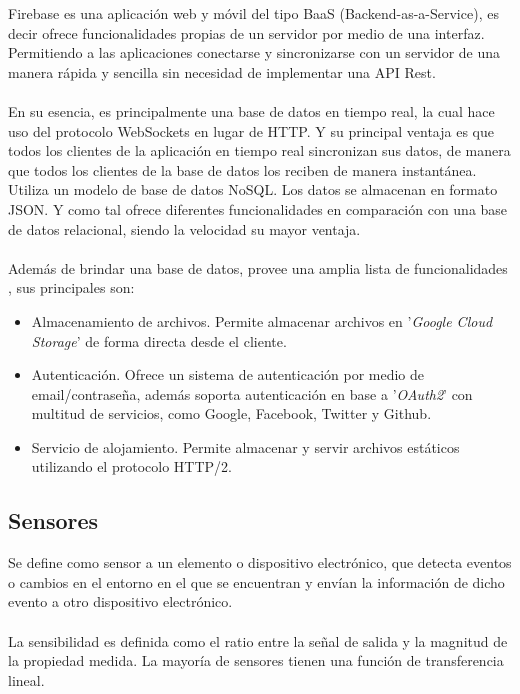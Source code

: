 Firebase \cite{firebase} es una aplicación web y móvil del tipo BaaS (Backend-as-a-Service), es decir ofrece funcionalidades propias de un servidor por medio de una interfaz. Permitiendo a las aplicaciones conectarse y sincronizarse con un servidor de una manera rápida y sencilla sin necesidad de implementar una API Rest.
\\
\\
En su esencia, es principalmente una base de datos en tiempo real, la cual hace uso del protocolo WebSockets en lugar de HTTP. Y su principal ventaja es que todos los clientes de la aplicación en tiempo real sincronizan sus datos, de manera que todos los clientes de la base de datos los reciben de manera instantánea.
\\
Utiliza un modelo de base de datos NoSQL. Los datos se almacenan en formato JSON. Y como tal ofrece diferentes funcionalidades en comparación con una base de datos relacional, siendo la velocidad su mayor ventaja.
\\
\\
Además de brindar una base de datos, provee una amplia lista de funcionalidades , sus principales son:
\begin{itemize}
\item Almacenamiento de archivos. Permite almacenar archivos en '\textit{Google Cloud Storage}' de forma directa desde el cliente.
\item Autenticación. Ofrece un sistema de autenticación por medio de email/contraseña, además soporta autenticación en base a '\textit{OAuth2}' con multitud de servicios, como Google, Facebook, Twitter y Github.
\item Servicio de alojamiento. Permite almacenar y servir archivos estáticos utilizando el protocolo HTTP/2.
\end{itemize}


\subsection{Sensores}

Se define como sensor a un elemento o dispositivo electrónico, que detecta eventos o cambios en el entorno en el que se encuentran y envían la información de dicho evento a otro dispositivo electrónico.
\\
\\
La sensibilidad es definida como el ratio entre la señal de salida y la magnitud de la propiedad medida. La mayoría de sensores tienen una función de transferencia lineal.

